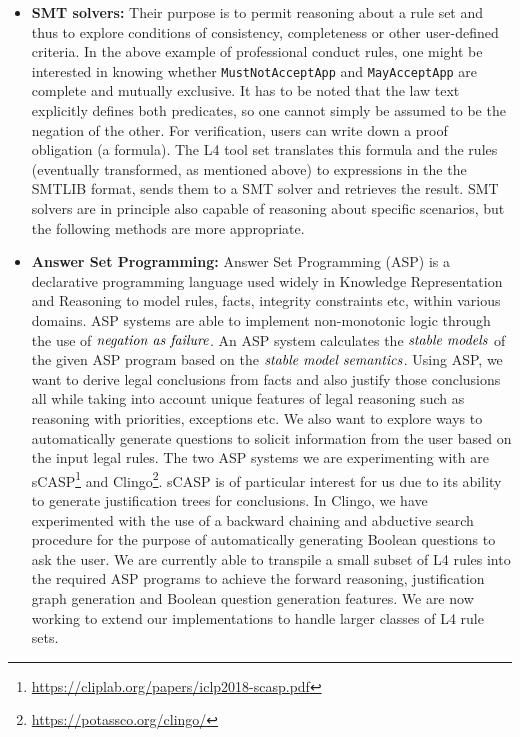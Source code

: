 \documentclass[runningheads]{llncs}
\begin{document}
\begin{itemize}
\item \textbf{SMT solvers:} Their purpose is to permit reasoning about a rule
  set and thus to explore conditions of consistency, completeness or other
  user-defined criteria. In the above example of professional conduct rules,
  one might be interested in knowing whether
  \texttt{MustNotAcceptApp} and \texttt{MayAcceptApp} are complete and
  mutually exclusive. It has to be noted that the law text explicitly defines
  both predicates, so one cannot simply be assumed to be the negation of the
  other. For verification, users can write down a proof obligation (a formula). The L4
  tool set translates this formula and the rules (eventually transformed, as
  mentioned above) to expressions in the the SMTLIB format, sends them to a
  SMT solver and retrieves the result. 
  SMT solvers are in principle also capable of reasoning about
  specific scenarios, but the following methods are more appropriate.
\item \textbf{Answer Set Programming:} 
Answer Set Programming (ASP) is a declarative programming language used widely in Knowledge Representation and Reasoning to model rules, facts, integrity constraints etc, within various domains. ASP systems are able to implement non-monotonic logic through the use of $\emph{negation as failure}$. An ASP system calculates the $\emph{stable models}$ of the given ASP program based on the $\emph{stable model semantics}$. Using ASP, we want to  derive legal conclusions from facts and also justify those conclusions all while taking into account unique features of legal reasoning such as reasoning with priorities, exceptions etc. We also want to explore ways to automatically generate questions to solicit information from the user based on the input legal rules.
The two ASP systems we are experimenting with are sCASP\footnote{\url{https://cliplab.org/papers/iclp2018-scasp.pdf}} and Clingo\footnote{\url{https://potassco.org/clingo/}}. sCASP is of particular interest for us due to its ability to generate justification trees for conclusions. In Clingo, we have experimented with the use of a backward chaining and abductive search procedure for the purpose of automatically generating Boolean questions to ask the user. We are currently able to transpile a small subset of L4 rules into the required ASP programs to achieve the forward reasoning, justification graph generation and Boolean question generation features. We are now working to extend our implementations to handle larger classes of L4 rule sets.


\end{itemize}
\end{document}
